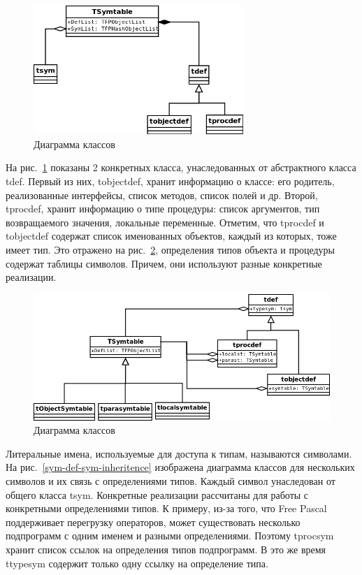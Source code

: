 \documentclass{imcs}
\begin{document}
\begin{figure}[htb]
\centering
\includegraphics[width=300px]{./uml/sym-def-def-inheritence.png}
\caption{Диаграмма классов}
\label{symboltable-sym-def}
\end{figure}

На рис.~\ref{symboltable-sym-def} показаны 2 конкретных класса, унаследованных от
абстрактного класса tdef. Первый из них, tobjectdef, хранит информацию о классе: 
его родитель, реализованные интерфейсы, список методов, список полей и др. Второй, tprocdef, хранит
информацию о типе процедуры: список аргументов, тип возвращаемого значения, локальные
переменные. Отметим, что tprocdef и tobjectdef содержат
список именованных объектов, каждый из которых, тоже имеет тип. Это отражено на
рис.~\ref{symtable-def}, определения типов объекта и процедуры содержат таблицы символов. Причем,
они используют разные конкретные реализации.

\begin{figure}[htb]
\centering
\includegraphics[width=\textwidth]{./uml/symtable-def.png}
\caption{Диаграмма классов}
\label{symtable-def}
\end{figure}

Литеральные имена, используемые для доступа к типам, называются символами. На
рис.~\ref{sym-def-sym-inheritence} изображена диаграмма классов для нескольких символов и 
их связь с определениями типов. Каждый символ унаследован от общего класса tsym. Конкретные
реализации рассчитаны для работы с конкретными определениями типов. К примеру, 
из-за того, что Free Pascal поддерживает перегрузку операторов, может существовать несколько
подпрограмм с одним именем и разными определениями. Поэтому tprocsym хранит список ссылок на 
определения типов подпрограмм. В это же время ttypesym содержит только одну ссылку на
определение типа.
\end{document}
